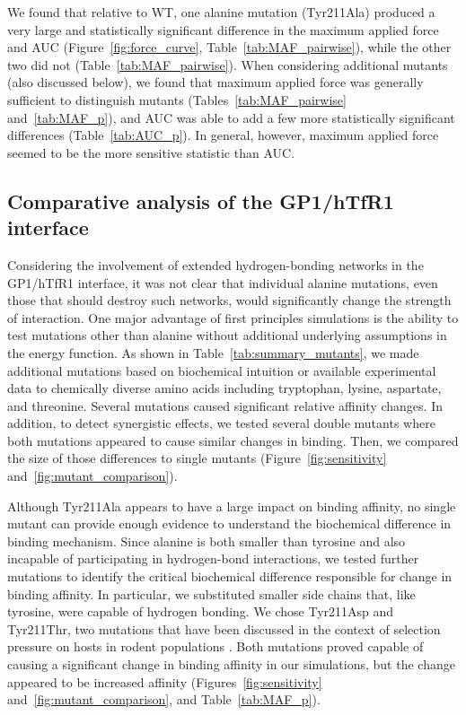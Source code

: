 \documentclass[journal=jacsat,manuscript=article]{achemso}
\begin{document}
We found that relative to WT, one alanine mutation (Tyr211Ala) produced a very large and statistically significant difference in the maximum applied force and AUC (Figure~\ref{fig:force_curve}, Table~\ref{tab:MAF_pairwise}), while the other two did not (Table~\ref{tab:MAF_pairwise}). When considering additional mutants (also discussed below), we found that maximum applied force was generally sufficient to distinguish mutants (Tables~\ref{tab:MAF_pairwise} and~\ref{tab:MAF_p}), and AUC was able to add a few more statistically significant differences (Table~\ref{tab:AUC_p}). In general, however, maximum applied force seemed to be the more sensitive statistic than AUC.

\subsection{Comparative analysis of the GP1/hTfR1 interface}
Considering the involvement of extended hydrogen-bonding networks in the GP1/hTfR1 interface, it was not clear that individual alanine mutations, even those that should destroy such networks, would significantly change the strength of interaction. One major advantage of first principles simulations is the ability to test mutations other than alanine without additional underlying assumptions in the energy function. As shown in Table~\ref{tab:summary_mutants}, we made additional mutations based on biochemical intuition or available experimental data to chemically diverse amino acids including tryptophan, lysine, aspartate, and threonine. Several mutations caused significant relative affinity changes. In addition, to detect synergistic effects, we tested several double mutants where both mutations appeared to cause similar changes in binding. Then, we compared the size of those differences to single mutants (Figure~\ref{fig:sensitivity} and~\ref{fig:mutant_comparison}).

Although Tyr211Ala appears to have a large impact on binding affinity, no single mutant can provide enough evidence to understand the biochemical difference in binding mechanism. Since alanine is both smaller than tyrosine and also incapable of participating in hydrogen-bond interactions, we tested further mutations to identify the critical biochemical difference responsible for change in binding affinity. In particular, we substituted smaller side chains that, like tyrosine, were capable of hydrogen bonding. We chose Tyr211Asp and Tyr211Thr, two mutations that have been discussed in the context of selection pressure on hosts in rodent populations \cite{Rad2008,Rad20111,Rad20112}. Both mutations proved capable of causing a significant change in binding affinity in our simulations, but the change appeared to be increased affinity (Figures~\ref{fig:sensitivity} and~\ref{fig:mutant_comparison}, and Table~\ref{tab:MAF_p}).
\end{document}
